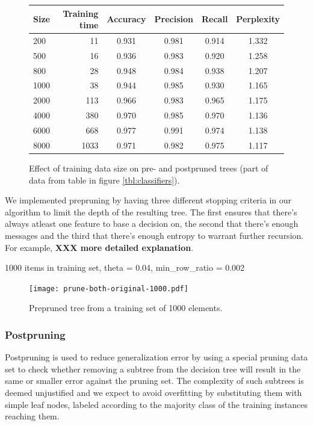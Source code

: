 \documentclass[a4paper,10pt]{article}
\newcommand{\XXX}[1]{{\bf XXX #1}}
\begin{document}
\begin{figure}
  \centering
\begin{tabular}{|l|r|c|c|c|c|}
\hline
Size & Training time & Accuracy & Precision & Recall &
Perplexity \\ \hline 
200  & 11 & 0.931 & 0.981 & 0.914 & 1.332 \\
500  & 16 & 0.936 & 0.983 & 0.920 & 1.258 \\
800  & 28 & 0.948 & 0.984 & 0.938 & 1.207 \\
1000 & 38 & 0.944 & 0.985 & 0.930 & 1.165 \\
2000 & 113 & 0.966 & 0.983 & 0.965 & 1.175 \\
4000 & 380 & 0.970 & 0.985 & 0.970 & 1.136 \\
6000 & 668 & 0.977 & 0.991 & 0.974 & 1.138 \\
8000 & 1033 & 0.971 & 0.982 & 0.975 & 1.117 \\
\hline
\end{tabular}
  \caption{Effect of training data size on pre- and postpruned trees (part of
    data from table in figure \ref{tbl:classifiers}).}
  \label{tbl:classifiers-prune-both} 
\end{figure}

We implemented prepruning by having three different stopping criteria in
our algorithm to limit the depth of the resulting tree.  The first ensures
that there's always atleast one feature to base a decision on, the second
that there's enough messages and the third that there's enough entropy to
warrant further recursion.  For example, \XXX{more detailed explanation}.

1000 items in training set, theta = 0.04, min\_row\_ratio = 0.002

\begin{figure}[h]
  \centering
  \begin{minipage}[c]{1.0\textwidth}
    \centering
\texttt{[image: prune-both-original-1000.pdf]}
  \end{minipage}
  \caption{Prepruned tree from a training set of 1000 elements.}
  \label{fig:prepruned-1000}
\end{figure}

\subsubsection{Postpruning}
\label{sect:postpruning}

Postpruning is used to reduce generalization error by using a special
pruning data set to check whether removing a subtree from the decision
tree will result in the same or smaller error against the pruning set.
The complexity of such subtrees is deemed unjustified and we expect
to avoid overfitting by substituting them with simple leaf nodes,
labeled according to the majority class of the training instances
reaching them\cite[p. 183]{alpaydin2004}.
\end{document}
